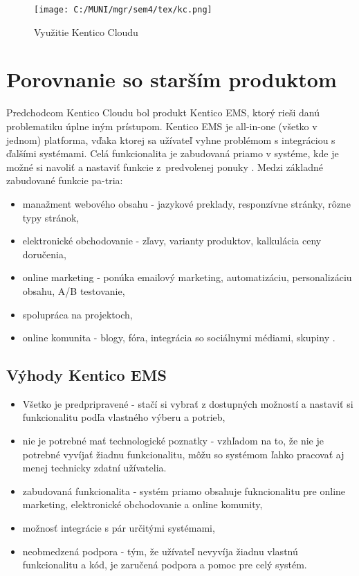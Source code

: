 \documentclass[
  printed, %
  table,   %
  lof,     %
  nolot,     %
  twoside,  
]{fithesis3}
\begin{document}
\begin{figure}[h]
  \begin{center}
        \texttt{[image: C:/MUNI/mgr/sem4/tex/kc.png]}
  \end{center}
  \caption{Využitie Kentico Cloudu \cite{cmsGuide}}
  \label{fig:kcuses}
\end{figure}

\section{Porovnanie so starším produktom}
Predchodcom Kentico Cloudu bol produkt Kentico EMS, ktorý rieši danú problematiku úplne iným prístupom. Kentico EMS je all-in-one (všetko v jednom) platforma, vďaka ktorej sa užívateľ vyhne problémom s integráciou s ďalšími systémami. Celá funkcionalita je zabudovaná priamo v systéme, kde je možné si navoliť a nastaviť funkcie z~predvolenej ponuky \cite{kcold}. Medzi základné zabudované funkcie pa-tria: 
\begin{itemize}
	\item manažment webového obsahu - jazykové preklady, responzívne stránky, rôzne typy stránok,
	\item elektronické obchodovanie - zľavy, varianty produktov, kalkulácia ceny doručenia,
	\item online marketing - ponúka emailový marketing, automatizáciu, personalizáciu obsahu, A/B testovanie,
	\item spolupráca na projektoch,
	\item online komunita - blogy, fóra, integrácia so sociálnymi médiami, skupiny \cite{kcguide}.
\end{itemize}
\subsection{Výhody Kentico EMS}
\begin{itemize}
	\item Všetko je predpripravené - stačí si vybrať z dostupných možností a nastaviť si funkcionalitu podľa vlastného výberu a potrieb,
	\item nie je potrebné mať technologické poznatky - vzhľadom na to, že nie je potrebné vyvíjať žiadnu funkcionalitu, môžu so systémom ľahko pracovať aj menej technicky zdatní užívatelia.
	\item zabudovaná funkcionalita - systém priamo obsahuje fukncionalitu pre online marketing, elektronické obchodovanie a online komunity,
	\item možnosť integrácie s pár určitými systémami,
	\item neobmedzená podpora - tým, že užívateľ nevyvíja žiadnu vlastnú funkcionalitu a kód, je zaručená podpora a pomoc pre celý systém.
\end{itemize}
\end{document}
